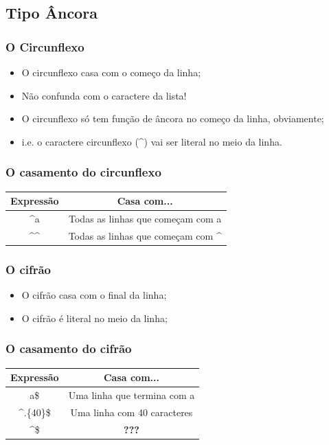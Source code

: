 \subsection{Tipo Âncora}


\begin{frame}
	\frametitle{O Circunflexo}

	\begin{itemize}
		\item O circunflexo casa com o começo da linha;
		\item Não confunda com o caractere da lista!
		\item O circunflexo só tem função de âncora no começo da linha, obviamente;
		\item i.e. o caractere circunflexo (\textasciicircum) vai ser literal no meio da linha.
	\end{itemize}
\end{frame}

\begin{frame}
	\frametitle{O casamento do circunflexo}
	\begin{center}
	\begin{tabular}{c|c}
		\textbf{Expressão} & \textbf{Casa com...} \\ \hline
		\textasciicircum a & Todas  as linhas que começam com a \\ \hline
		\textasciicircum \textasciicircum & Todas as linhas que começam com \textasciicircum \\ \hline
	\end{tabular}
	\end{center}
\end{frame}


\begin{frame}
	\frametitle{O cifrão}

	\begin{itemize}
		\item O cifrão casa com o final da linha;
		\item O cifrão é literal no meio da linha;
	\end{itemize}
\end{frame}

\begin{frame}
	\frametitle{O casamento do cifrão}

	\begin{center}
	\begin{tabular}{c|c}
		\textbf{Expressão} & \textbf{Casa com...} \\ \hline
		a\$		& Uma linha que termina com a \\ \hline
		\textasciicircum .\{40\}\$ & Uma linha com 40 caracteres \\ \hline
		\textasciicircum \$ & \textbf{???}		\\ \hline
	\end{tabular}
	\end{center}

\end{frame}

